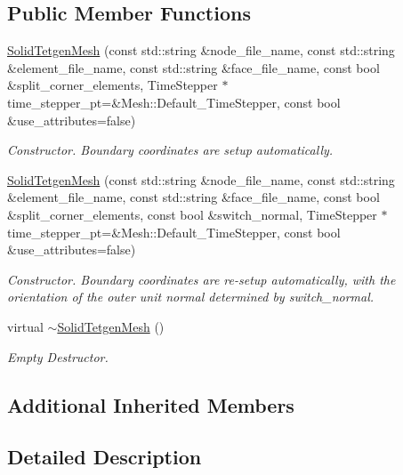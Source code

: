 \subsection*{Public Member Functions}
\begin{DoxyCompactItemize}
\item 
\hyperlink{classoomph_1_1SolidTetgenMesh_a0672182524354abfccbbd85007753bbe}{Solid\+Tetgen\+Mesh} (const std\+::string \&node\+\_\+file\+\_\+name, const std\+::string \&element\+\_\+file\+\_\+name, const std\+::string \&face\+\_\+file\+\_\+name, const bool \&split\+\_\+corner\+\_\+elements, Time\+Stepper $\ast$time\+\_\+stepper\+\_\+pt=\&Mesh\+::\+Default\+\_\+\+Time\+Stepper, const bool \&use\+\_\+attributes=false)
\begin{DoxyCompactList}\small\item\em Constructor. Boundary coordinates are setup automatically. \end{DoxyCompactList}\item 
\hyperlink{classoomph_1_1SolidTetgenMesh_a465c659e5bac66790a81f013bef23157}{Solid\+Tetgen\+Mesh} (const std\+::string \&node\+\_\+file\+\_\+name, const std\+::string \&element\+\_\+file\+\_\+name, const std\+::string \&face\+\_\+file\+\_\+name, const bool \&split\+\_\+corner\+\_\+elements, const bool \&switch\+\_\+normal, Time\+Stepper $\ast$time\+\_\+stepper\+\_\+pt=\&Mesh\+::\+Default\+\_\+\+Time\+Stepper, const bool \&use\+\_\+attributes=false)
\begin{DoxyCompactList}\small\item\em Constructor. Boundary coordinates are re-\/setup automatically, with the orientation of the outer unit normal determined by switch\+\_\+normal. \end{DoxyCompactList}\item 
virtual \hyperlink{classoomph_1_1SolidTetgenMesh_afbd361be70e8d0f585a63cc300a26af7}{$\sim$\+Solid\+Tetgen\+Mesh} ()
\begin{DoxyCompactList}\small\item\em Empty Destructor. \end{DoxyCompactList}\end{DoxyCompactItemize}
\subsection*{Additional Inherited Members}


\subsection{Detailed Description}
